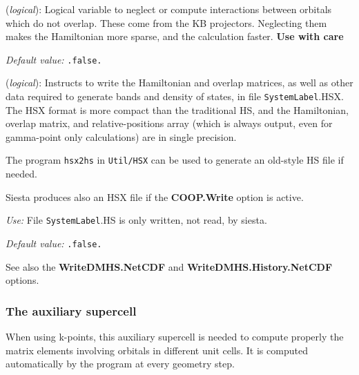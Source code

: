 \documentclass[11pt]{article}
\begin{document}
\begin{description}
\itemsep 10pt
\parsep 0pt

\item[{\bf NeglNonOverlapInt}] ({\it logical}):
Logical variable to neglect or compute interactions between orbitals
which do not overlap. These come from the KB projectors.
Neglecting them makes the Hamiltonian more sparse, and
the calculation faster.  {\bf Use with care}

{\it Default value:} {\tt .false.}

\item[{\bf SaveHS}] ({\it logical}):
Instructs to write the Hamiltonian and overlap matrices, as well
as other data required to generate bands and density of states,
in file {\tt SystemLabel}.HSX. The HSX format is more
compact than the traditional HS, and the Hamiltonian,
overlap matrix, and relative-positions array (which is always output,
even for gamma-point only calculations) are in single precision.

The program {\tt hsx2hs} in {\tt Util/HSX} can be used to generate
an old-style HS file if needed.

{\sc Siesta} produces also an HSX file if the {\bf COOP.Write} option
is active.

{\it Use:} File {\tt SystemLabel}.HS is only written, not read, by siesta.

{\it Default value:} {\tt .false.}

See also the {\bf WriteDMHS.NetCDF} and {\bf WriteDMHS.History.NetCDF}
options.
\end{description}

\subsubsection{The auxiliary supercell}

When using k-points, this auxiliary supercell is needed to compute properly
the matrix elements involving orbitals in different unit cells.
It is computed automatically by the program at every geometry step.
\end{document}
